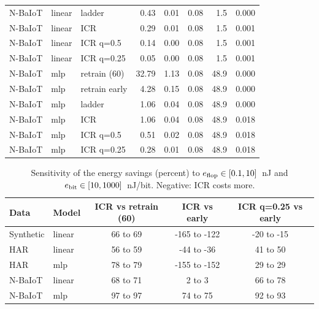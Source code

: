 \begin{table}[h]
\begin{tabular}{@{}lllrrrrr@{}}
N-BaIoT & linear & ladder & 0.43 & 0.01 & 0.08 & 1.5 & 0.000 \\
N-BaIoT & linear & ICR & 0.29 & 0.01 & 0.08 & 1.5 & 0.001 \\
N-BaIoT & linear & ICR q=0.5 & 0.14 & 0.00 & 0.08 & 1.5 & 0.001 \\
N-BaIoT & linear & ICR q=0.25 & 0.05 & 0.00 & 0.08 & 1.5 & 0.001 \\
N-BaIoT & mlp & retrain (60) & 32.79 & 1.13 & 0.08 & 48.9 & 0.000 \\
N-BaIoT & mlp & retrain early & 4.28 & 0.15 & 0.08 & 48.9 & 0.000 \\
N-BaIoT & mlp & ladder & 1.06 & 0.04 & 0.08 & 48.9 & 0.000 \\
N-BaIoT & mlp & ICR & 1.06 & 0.04 & 0.08 & 48.9 & 0.018 \\
N-BaIoT & mlp & ICR q=0.5 & 0.51 & 0.02 & 0.08 & 48.9 & 0.018 \\
N-BaIoT & mlp & ICR q=0.25 & 0.28 & 0.01 & 0.08 & 48.9 & 0.018 \\
\bottomrule
\end{tabular}
\end{table}

\begin{table}[h]
\centering
\caption{Sensitivity of the energy savings (percent) to $e_{\rm flop}\in[0.1,10]$~nJ and $e_{\rm bit}\in[10,1000]$~nJ/bit. Negative: ICR costs more.}\label{tab:s_sens}
\footnotesize
\setlength{\tabcolsep}{3pt}
\begin{tabular}{@{}llccc@{}}
\toprule
Data & Model & ICR vs retrain (60) & ICR vs early & ICR q=0.25 vs early \\
\midrule
Synthetic & linear & 66 to 69 & -165 to -122 & -20 to -15 \\
HAR & linear & 56 to 59 & -44 to -36 & 41 to 50 \\
HAR & mlp & 78 to 79 & -155 to -152 & 29 to 29 \\
N-BaIoT & linear & 68 to 71 & 2 to 3 & 66 to 78 \\
N-BaIoT & mlp & 97 to 97 & 74 to 75 & 92 to 93 \\
\bottomrule
\end{tabular}
\end{table}

